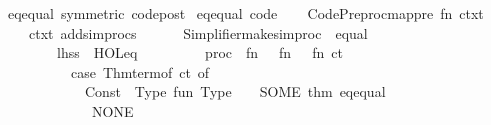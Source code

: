 \begin{isabellebody}
%
\isadelimproof
\isanewline
%
\endisadelimproof
\isanewline
{}\isamarkupfalse%
\isanewline
\isanewline
{}\isamarkupfalse%
\ eq{\isacharunderscore}{\kern0pt}equal\ {\isacharbrackleft}{\kern0pt}symmetric{\isacharcomma}{\kern0pt}\ code{\isacharunderscore}{\kern0pt}post{\isacharbrackright}{\kern0pt}\isanewline
{}\isamarkupfalse%
\ eq{\isacharunderscore}{\kern0pt}equal\ {\isacharbrackleft}{\kern0pt}code{\isacharbrackright}{\kern0pt}\isanewline
%
\isadelimML
\isanewline
%
\endisadelimML
%
\isatagML
{}\isamarkupfalse%
\ {\isacartoucheopen}\isanewline
\ \ Code{\isacharunderscore}{\kern0pt}Preproc{\isachardot}{\kern0pt}map{\isacharunderscore}{\kern0pt}pre\ {\isacharparenleft}{\kern0pt}fn\ ctxt\ {\isacharequal}{\kern0pt}{\isachargreater}{\kern0pt}\isanewline
\ \ \ \ ctxt\ addsimprocs\isanewline
\ \ \ \ \ \ {\isacharbrackleft}{\kern0pt}Simplifier{\isachardot}{\kern0pt}make{\isacharunderscore}{\kern0pt}simproc\ \isactrlcontext \ {\isachardoublequote}{\kern0pt}equal{\isachardoublequote}{\kern0pt}\isanewline
\ \ \ \ \ \ \ \ {\isacharbraceleft}{\kern0pt}lhss\ {\isacharequal}{\kern0pt}\ {\isacharbrackleft}{\kern0pt}\isactrlterm {\isasymopen}HOL{\isachardot}{\kern0pt}eq{\isasymclose}{\isacharbrackright}{\kern0pt}{\isacharcomma}{\kern0pt}\isanewline
\ \ \ \ \ \ \ \ \ proc\ {\isacharequal}{\kern0pt}\ fn\ {\isacharunderscore}{\kern0pt}\ {\isacharequal}{\kern0pt}{\isachargreater}{\kern0pt}\ fn\ {\isacharunderscore}{\kern0pt}\ {\isacharequal}{\kern0pt}{\isachargreater}{\kern0pt}\ fn\ ct\ {\isacharequal}{\kern0pt}{\isachargreater}{\kern0pt}\isanewline
\ \ \ \ \ \ \ \ \ \ {\isacharparenleft}{\kern0pt}case\ Thm{\isachardot}{\kern0pt}term{\isacharunderscore}{\kern0pt}of\ ct\ of\isanewline
\ \ \ \ \ \ \ \ \ \ \ \ Const\ {\isacharparenleft}{\kern0pt}{\isacharunderscore}{\kern0pt}{\isacharcomma}{\kern0pt}\ Type\ {\isacharparenleft}{\kern0pt}\isactrltypeUNDERSCOREname {\isasymopen}fun{\isasymclose}{\isacharcomma}{\kern0pt}\ {\isacharbrackleft}{\kern0pt}Type\ {\isacharunderscore}{\kern0pt}{\isacharcomma}{\kern0pt}\ {\isacharunderscore}{\kern0pt}{\isacharbrackright}{\kern0pt}{\isacharparenright}{\kern0pt}{\isacharparenright}{\kern0pt}\ {\isacharequal}{\kern0pt}{\isachargreater}{\kern0pt}\ SOME\ {\isacharat}{\kern0pt}{\isacharbraceleft}{\kern0pt}thm\ eq{\isacharunderscore}{\kern0pt}equal{\isacharbraceright}{\kern0pt}\isanewline
\ \ \ \ \ \ \ \ \ \ {\isacharbar}{\kern0pt}\ {\isacharunderscore}{\kern0pt}\ {\isacharequal}{\kern0pt}{\isachargreater}{\kern0pt}\ NONE{\isacharparenright}{\kern0pt}{\isacharbraceright}{\kern0pt}{\isacharbrackright}{\kern0pt}{\isacharparenright}{\kern0pt}\isanewline

\end{isabellebody}
